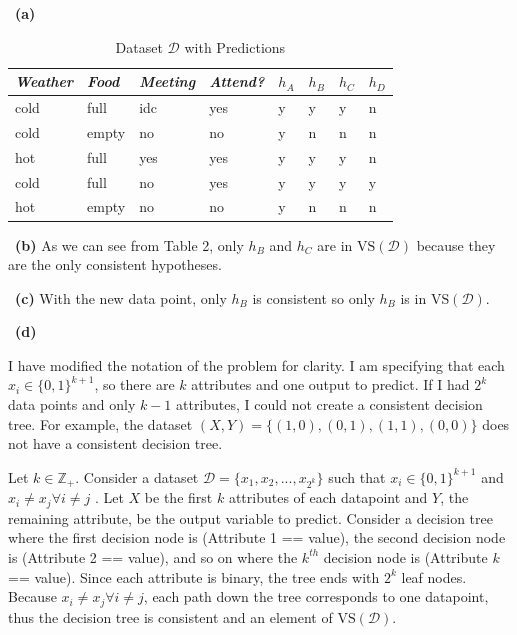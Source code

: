 \documentclass[a4 paper, 15pt]{article}
\numberwithin{equation}{section}
\newcommand{\subproblem}[1]{~\newline\textbf{(#1)}}
\newcommand{\D}{\mathcal{D}}
\newcommand{\VS}{\textrm{VS}}
\begin{document}
\subproblem{a}
\begin{table}[h]
\centering
\begin{tabular}{@{}lll|l@{}|llll}
	\toprule
	\textit{Weather} & \textit{Food} & \textit{Meeting} & \textit{Attend?} & $h_{A}$ & $h_{B}$ & $h_{C}$ & $h_{D}$  \\ \midrule
	cold             & full          & idc              & yes             & y & y & y & n  \\
	cold             & empty         & no               & no              & y & n & n & n  \\
	hot              & full          & yes              & yes             & y & y & y & n  \\
	cold             & full          & no               & yes             & y & y & y & y  \\
	hot              & empty         & no               & no              & y & n & n & n  \\ \bottomrule
\end{tabular}
\caption{Dataset $\D$ with Predictions\label{table:2}}
\end{table}

\subproblem{b} As we can see from Table 2, only $h_{B}$ and $h_{C}$ are in $\VS(\D)$ because they are the only consistent hypotheses.

\subproblem{c} With the new data point, only $h_{B}$ is consistent so only $h_{B}$ is in $\VS(\D)$.

\subproblem{d}

I have modified the notation of the problem for clarity. I am specifying that each  $x_{i} \in \{0, 1\}^{k+1}$, so there are $k$ attributes and one output to predict. If I had $2^{k}$ data points and only $k-1$ attributes, I could not create a consistent decision tree.  For example, the dataset $(X,Y) = \{(1,0),(0,1),(1,1),(0,0)\}$ does not have a consistent decision tree.

Let $k \in \mathbb{Z}_{+}$. Consider a dataset $\D = \{x_{1}, x_{2}, . . . , x_{2^{k}}\}$ such that $x_{i} \in \{0, 1\}^{k+1}$ and $x_{i} \ne x_{j} \forall i\ne j$ . Let $X$ be the first $k$ attributes of each datapoint and $Y$, the remaining attribute, be the output variable to predict. Consider a decision tree where the first decision node is (Attribute 1 == value), the second decision node is (Attribute 2 == value), and so on where the $k^{th}$ decision node is (Attribute $k$ == value). Since each attribute is binary, the tree ends with $2^{k}$ leaf nodes.  Because $x_{i} \ne x_{j} \forall i\ne j$, each path down the tree corresponds to one datapoint, thus the decision tree is consistent and an element of $\VS(\D)$.
\end{document}
